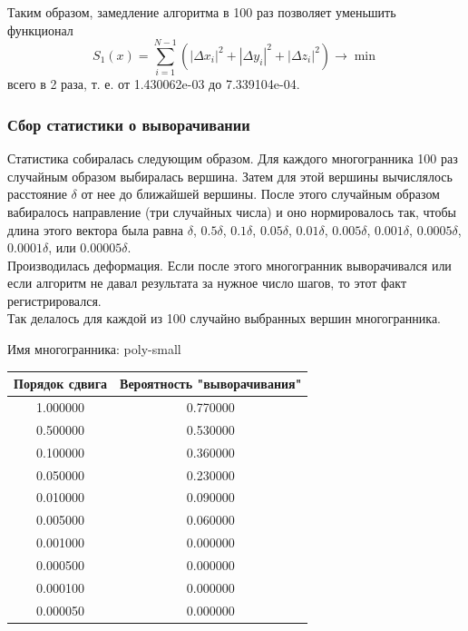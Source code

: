 \documentclass[a4paper,12pt, titlepage]{article}
\begin{document}
\begin{flushleft}
 Таким образом, замедление алгоритма в 100 раз позволяет уменьшить функционал
$$	
	S_{1}(x) = \sum\limits_{i = 1}^{N - 1}(|\Delta x_{i}|^{2} + |\Delta y_{i}|^{2} + |\Delta z_{i}|^{2})\to \min		
$$
всего в 2 раза, т. е. от 1.430062e-03 до 7.339104e-04.
\end{flushleft}


\subsubsection{Сбор статистики о выворачивании}
\begin{flushleft}
 Статистика собиралась следующим образом. Для каждого многогранника 100 раз случайным образом
выбиралась вершина. Затем для этой вершины вычислялось расстояние $\delta$ от нее до ближайшей вершины.
После этого случайным образом вабиралось направление (три случайных числа) и оно нормировалось так, чтобы
длина этого вектора была равна $\delta$, $0.5\delta$, $0.1\delta$, $0.05\delta$, $0.01\delta$, $0.005\delta$, $0.001\delta$,
$0.0005\delta$, $0.0001\delta$, или $0.00005\delta$. \\
Производилась деформация. Если после этого многогранник выворачивался или если алгоритм не давал
результата за нужное число шагов, то этот факт регистрировался.\\
Так делалось для каждой из 100 случайно выбранных вершин многогранника.
\end{flushleft}

\begin{flushleft}
Имя многогранника: poly-small\\
\begin{tabular}{|c|c|}
\hline
	Порядок сдвига & Вероятность "выворачивания"\\
\hline
	1.000000 &	0.770000\\
\hline
	0.500000 &	0.530000\\
\hline
	0.100000 &	0.360000\\
\hline
	0.050000 &	0.230000\\
\hline
	0.010000 &	0.090000\\
\hline
	0.005000 &	0.060000\\
\hline
	0.001000 &	0.000000\\
\hline
	0.000500 &	0.000000\\
\hline
	0.000100 &	0.000000\\
\hline
	0.000050 &	0.000000\\
\hline
\end{tabular} 
\end{flushleft}
\end{document}
